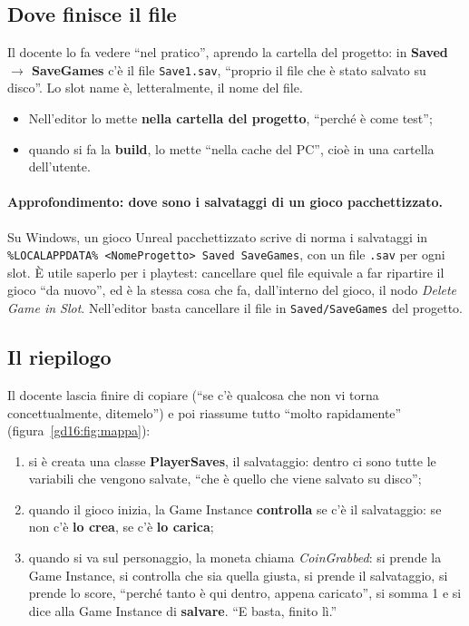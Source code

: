 \subsection{Dove finisce il file}

Il docente lo fa vedere ``nel pratico'', aprendo la cartella del progetto: in
\textbf{Saved $\rightarrow$ SaveGames} c'è il file \texttt{Save1.sav}, ``proprio
il file che è stato salvato su disco''. Lo slot name è, letteralmente, il nome
del file.
\begin{itemize}
  \item Nell'editor lo mette \textbf{nella cartella del progetto}, ``perché è
        come test'';
  \item quando si fa la \textbf{build}, lo mette ``nella cache del PC'', cioè
        in una cartella dell'utente.
\end{itemize}

\paragraph{Approfondimento: dove sono i salvataggi di un gioco pacchettizzato.}
Su Windows, un gioco Unreal pacchettizzato scrive di norma i salvataggi in
\texttt{\%LOCALAPPDATA\% <NomeProgetto>
Saved SaveGames}, con un file \texttt{.sav} per ogni slot. È
utile saperlo per i playtest: cancellare quel file equivale a far ripartire il
gioco ``da nuovo'', ed è la stessa cosa che fa, dall'interno del gioco, il nodo
\emph{Delete Game in Slot}. Nell'editor basta cancellare il file in
\texttt{Saved/SaveGames} del progetto.

\subsection{Il riepilogo}

Il docente lascia finire di copiare (``se c'è qualcosa che non vi torna
concettualmente, ditemelo'') e poi riassume tutto ``molto rapidamente''
(figura~\ref{gd16:fig:mappa}):
\begin{enumerate}
  \item si è creata una classe \textbf{PlayerSaves}, il salvataggio: dentro ci
        sono tutte le variabili che vengono salvate, ``che è quello che viene
        salvato su disco'';
  \item quando il gioco inizia, la Game Instance \textbf{controlla} se c'è il
        salvataggio: se non c'è \textbf{lo crea}, se c'è \textbf{lo carica};
  \item quando si va sul personaggio, la moneta chiama \emph{CoinGrabbed}: si
        prende la Game Instance, si controlla che sia quella giusta, si prende il
        salvataggio, si prende lo score, ``perché tanto è qui dentro, appena
        caricato'', si somma 1 e si dice alla Game Instance di
        \textbf{salvare}. ``E basta, finito lì.''
\end{enumerate}

